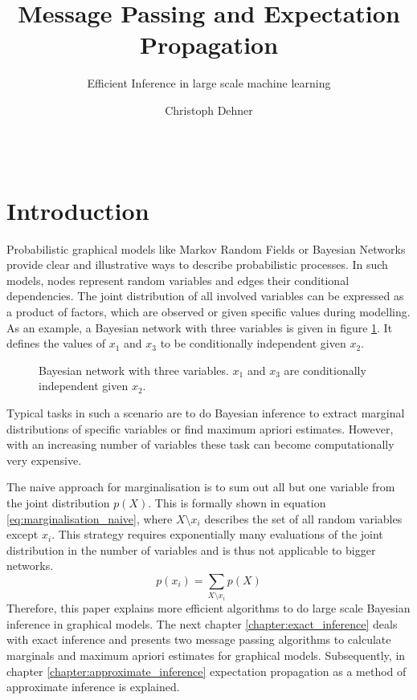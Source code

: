\documentclass{sigkdd}
\title{Message Passing and Expectation Propagation}
\subtitle{Efficient Inference in large scale machine learning}
\author{
\alignauthor Christoph Dehner \\
\affaddr{Department of Informatics}\\
\affaddr{Technische Universit\"at M\"unchen}\\
\email{dehner@in.tum.de}
}
\begin{document}
\maketitle

\begin{abstract}
\blindtext
\end{abstract}

\section{Introduction}
Probabilistic graphical models like Markov Random Fields or Bayesian Networks provide clear and illustrative ways to describe probabilistic processes. In such models, nodes represent random variables and edges their conditional dependencies. The joint distribution of all involved variables can be expressed as a product of factors, which are observed or given specific values during modelling. As an example, a Bayesian network with three variables is given in figure \ref{fig:BN}. It defines the values of $x_1$ and $x_3$ to be conditionally independent given $x_2$.
\begin{figure}[h]
	\centering
	\caption{Bayesian network with three variables. $x_1$ and $x_3$ are conditionally independent given $x_2$.}\label{fig:BN}
\end{figure}

Typical tasks in such a scenario are to do Bayesian inference to extract marginal distributions of specific variables or find maximum apriori estimates. However, with an increasing number of variables these task can become computationally very expensive. 

The naive approach for marginalisation is to sum out all but one variable from the joint distribution $p(X)$. This is formally shown in equation \ref{eq:marginalisation_naive}, where $X \setminus x_i$ describes the set of all random variables except $x_i$.
This strategy requires exponentially many evaluations of the joint distribution in the number of variables and is thus not applicable to bigger networks.
\begin{equation}\label{eq:marginalisation_naive}
p(x_i)= \sum_{X \setminus x_i} p(X)
\end{equation}
Therefore, this paper explains more efficient algorithms to do large scale Bayesian inference in graphical models. The next chapter \ref{chapter:exact_inference} deals with exact inference and presents two message passing algorithms to calculate marginals and maximum apriori estimates for graphical models. Subsequently, in chapter \ref{chapter:approximate_inference} expectation propagation as a method of approximate inference is explained.
\end{document}
